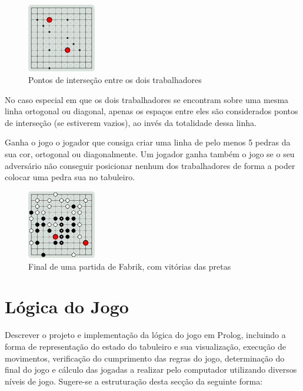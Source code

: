 \documentclass[a4paper]{article}
\begin{document}
\begin{figure}[h!]
\begin{center}
\includegraphics[height=3cm,width=3cm]{images/fabrik_intersection.png}
\caption{Pontos de interseção entre os dois trabalhadores}
\label{Figura 2}
\end{center}
\end{figure}

No caso especial em que os dois trabalhadores se encontram sobre uma mesma linha ortogonal ou diagonal, apenas os espaços entre eles são considerados pontos de interseção (se estiverem vazios), ao invés da totalidade dessa linha.

Ganha o jogo o jogador que consiga criar uma linha de pelo menos 5 pedras da sua cor, ortogonal ou diagonalmente. Um jogador ganha também o jogo se o seu adversário não conseguir posicionar nenhum dos trabalhadores de forma a poder colocar uma pedra sua no tabuleiro.

\begin{figure}[h!]
\begin{center}
\includegraphics[height=3cm,width=3cm]{images/fabrik_full_board.png}
\caption{Final de uma partida de Fabrik, com vitórias das pretas}
\label{Figura 3}
\end{center}
\end{figure}


\newpage

\section{Lógica do Jogo}

Descrever o projeto e implementação da lógica do jogo em Prolog, incluindo a forma de representação do estado do tabuleiro e sua visualização, execução de movimentos, verificação do cumprimento das regras do jogo, determinação do final do jogo e cálculo das jogadas a realizar pelo computador utilizando diversos níveis de jogo. Sugere-se a estruturação desta secção da seguinte forma:
\end{document}
